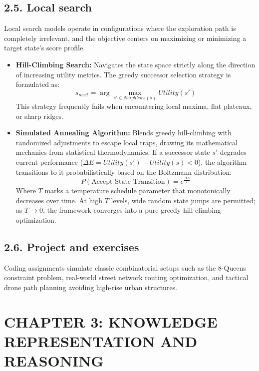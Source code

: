 \documentclass[11pt,a4paper]{article}
\begin{document}
\subsection{2.5. Local search}
Local search models operate in configurations where the exploration path is completely irrelevant, and the objective centers on maximizing or minimizing a target state's score profile.
\begin{itemize}
    \item \textbf{Hill-Climbing Search:} Navigates the state space strictly along the direction of increasing utility metrics. The greedy successor selection strategy is formulated as:
    \begin{equation}
        s_{next} = \arg\max_{s' \in Neighbors(s)} Utility(s')
    \end{equation}
    This strategy frequently fails when encountering local maxima, flat plateaux, or sharp ridges.
    \item \textbf{Simulated Annealing Algorithm:} Blends greedy hill-climbing with randomized adjustments to escape local traps, drawing its mathematical mechanics from statistical thermodynamics. If a successor state $s'$ degrades current performance ($\Delta E = Utility(s') - Utility(s) < 0$), the algorithm transitions to it probabilistically based on the Boltzmann distribution:
    \begin{equation}
        P(\text{Accept State Transition}) = e^{\frac{\Delta E}{T}}
    \end{equation}
    Where $T$ marks a temperature schedule parameter that monotonically decreases over time. At high $T$ levels, wide random state jumps are permitted; as $T \rightarrow 0$, the framework converges into a pure greedy hill-climbing optimization.
\end{itemize}

\subsection{2.6. Project and exercises}
Coding assignments simulate classic combinatorial setups such as the 8-Queens constraint problem, real-world street network routing optimization, and tactical drone path planning avoiding high-rise urban structures.

\section{CHAPTER 3: KNOWLEDGE REPRESENTATION AND REASONING}
\end{document}
